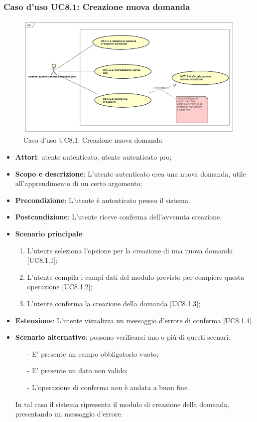 \subsubsection{Caso d'uso UC8.1: Creazione nuova domanda}
	\label{UC8.1}
	\begin{figure}[h]
		\centering
			\includegraphics[scale=0.45,keepaspectratio]{UML/UC8_1.png}
		\caption{Caso d'uso UC8.1: Creazione nuova domanda}
	\end{figure}
	\FloatBarrier
	\begin{itemize}
		\item
			\textbf{Attori}: utente autenticato, utente autenticato pro;
		\item		
			\textbf{Scopo e descrizione}: L'utente autenticato crea una nuova domanda, utile all'apprendimento di un certo argomento;
		\item
			\textbf{Precondizione}: L'utente è autenticato presso il sistema. 
		\item
			\textbf{	Postcondizione}: L'utente riceve conferma dell'avvenuta creazione.		
		\item
			\textbf{Scenario principale}:
	       		\begin{enumerate}
					\item 	
					L'utente seleziona l'opzione per la creazione di una nuova domanda [UC8.1.1];
					\item
					L'utente compila i campi dati del modulo previsto per compiere questa operazione [UC8.1.2];
					\item
					L'utente conferma la creazione della domanda [UC8.1.3];
	 			\end{enumerate}
	 	\item
			\textbf{Estensione}: L'utente visualizza un messaggio d'errore di conferma [UC8.1.4].
	 	\item
	 		\textbf{Scenario alternativo}: possono verificarsi uno o più di questi scenari:
				\begin{itemize}
					\item[-] 	
						E' presente un campo obbligatorio vuoto;
					\item[-] 
    						E' presente un dato non valido;
					\item[-] 
						L'operazione di conferma non è andata a buon fine.
				\end{itemize}
			In tal caso il sistema ripresenta il modulo di creazione della domanda, presentando un messaggio d'errore.
	\end{itemize}
